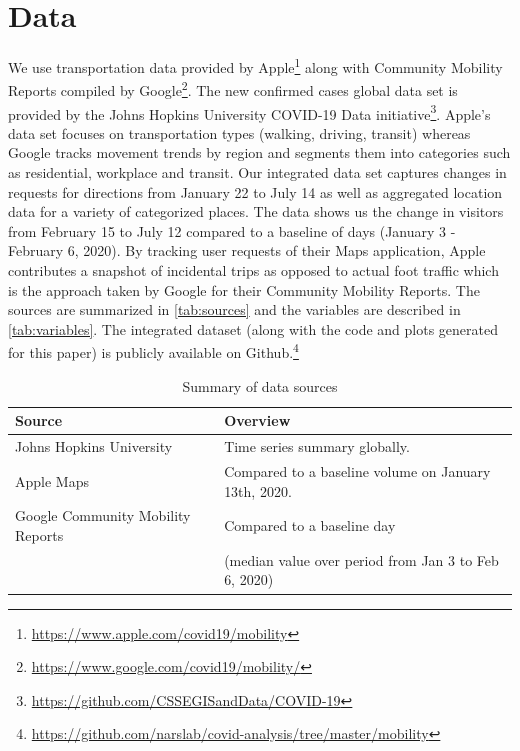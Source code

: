 \documentclass[preprint, 12pt]{elsarticle}
\newcommand{\?}{\stackrel{?}{=}}
\begin{document}
\section{Data}
We use transportation data provided by Apple\footnote{\url{https://www.apple.com/covid19/mobility}} along with Community Mobility Reports compiled by Google\footnote{\url{https://www.google.com/covid19/mobility/}}. %
The new confirmed cases global data set is provided by the Johns Hopkins University COVID-19 Data initiative\footnote{\url{https://github.com/CSSEGISandData/COVID-19}}.
Apple's data set focuses on transportation types (walking, driving, transit) whereas Google tracks movement trends by region and segments them into categories such as residential, workplace and transit. Our integrated data set captures changes in requests for directions from January 22 to July 14 as well as aggregated location data for a variety of categorized places. The data shows us the change in visitors from February 15 to July 12 compared to a baseline of days (January 3 - February 6, 2020). By tracking user requests of their Maps application, Apple contributes a snapshot of incidental trips as opposed to actual foot traffic which is the approach taken by Google for their Community Mobility Reports. 
The sources are summarized in \autoref{tab:sources} and the variables are described in \autoref{tab:variables}.
The integrated dataset (along with the code and plots generated for this paper) is publicly available on Github.\footnote{\url{https://github.com/narslab/covid-analysis/tree/master/mobility}}


\begin{table}[h!]\small
  \centering
  \caption{Summary of data sources}
  \label{tab:sources}
\begin{tabular}{ll}\toprule
\bf Source                         & \bf Overview                                                                              \\\midrule
Johns Hopkins University          & Time series summary globally.                                                               \\
Apple Maps                        & Compared to a baseline volume on January 13th, 2020.                                          \\
  Google Community Mobility Reports & Compared to a baseline day \\
  & (median value over period from Jan 3 to Feb 6, 2020)\\\bottomrule
\end{tabular}
\end{table}
\end{document}
